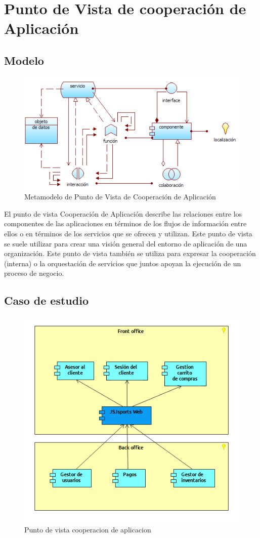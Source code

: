 \section{Punto de Vista de cooperación de Aplicación}

\subsection{Modelo}

\begin{figure}[th!]
	\centering
	\includegraphics[width=0.7\linewidth]{arquitectura/imagenes/modeloCooperacionAplicacion}
	\caption{Metamodelo de Punto de Vista de Cooperación de Aplicación \cite{pun8}}
	\label{fig:metamodelo de punto de vista de cooperación de aplicación}
\end{figure}

El punto de vista Cooperación de Aplicación describe las relaciones entre los componentes de las aplicaciones en términos de los flujos de información entre ellos o en términos de los servicios que se ofrecen y utilizan. Este punto de vista se suele utilizar para crear una visión general del entorno de aplicación de una organización. Este punto de vista también se utiliza para expresar la cooperación (interna) o la orquestación de servicios que juntos apoyan la ejecución de un proceso de negocio.

\subsection{Caso de estudio}
\begin{figure}[th!]
	\centering
	\includegraphics[width=0.5\linewidth]{arquitectura/imagenes/VistaCooperacionAplicacion}
	\caption{Punto de vista cooperacion de aplicacion}
	\label{fig:vistacooperacionaplicacion}
\end{figure}


